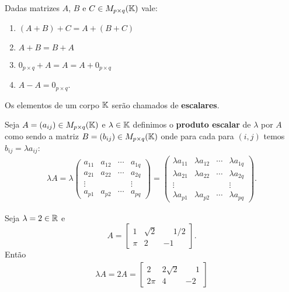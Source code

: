 \begin{proposicao}
  Dadas matrizes $A$, $B$ e $C \in M_{p\times q}(\mathbb{K})$ vale:
  \begin{enumerate}[label={\roman*})]
    \item $(A + B) + C = A + (B + C)$
    \item $A + B = B + A$
        \item $0_{p\times q} + A = A = A + 0_{p\times q}$
        \item $A - A = 0_{p\times q}$.
  \end{enumerate}
\end{proposicao}

\begin{observacao}
    Os elementos de um corpo $\mathbb{K}$ serão chamados de \textbf{escalares}.
\end{observacao}

\begin{definicao}
    Seja $A = (a_{ij}) \in M_{p\times q}(\mathbb{K})$ e $\lambda \in \mathbb{K}$ definimos o \textbf{produto escalar} de $\lambda$ por $A$ como sendo a matriz $B = (b_{ij}) \in M_{p\times q}(\mathbb{K})$ onde para cada para $(i,j)$ temos $b_{ij} = \lambda a_{ij}$:
  \begin{align*}
    \lambda A = \lambda \begin{pmatrix}
    a_{11} & a_{12} & \cdots & a_{1q}\\
    a_{21} & a_{22} & \cdots & a_{2q}\\
    \vdots & & & \vdots\\
    a_{p1} & a_{p2} & \cdots & a_{pq}
  \end{pmatrix} = \begin{pmatrix}
    \lambda a_{11} & \lambda a_{12} & \cdots & \lambda a_{1q}\\
    \lambda a_{21} & \lambda a_{22} & \cdots & \lambda a_{2q}\\
    \vdots & & & \vdots\\
    \lambda a_{p1} & \lambda a_{p2} & \cdots & \lambda a_{pq}
  \end{pmatrix}.
  \end{align*}
\end{definicao}
\begin{exemplo}
    Seja $\lambda = 2 \in \mathbb{R}$ e
    \[
        A = \begin{bmatrix}
            1 & \sqrt{2} & \phantom{-}1/2\\
            \pi & 2 & -1
        \end{bmatrix}.
    \]
    Então
    \begin{align*}
        \lambda A = 2A = \begin{bmatrix}
            2 & 2\sqrt{2} & \phantom{-}1\\
            2\pi & 4 & -2
        \end{bmatrix}
    \end{align*}
\end{exemplo}

